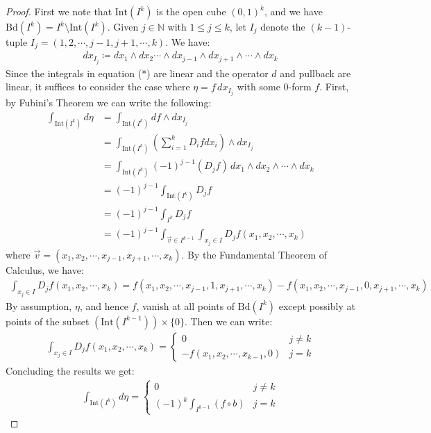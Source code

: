 \documentclass[11pt,oneside]{book}
\theoremstyle{break}
\theoremstyle{break}
\newcommand{\N}{\mathbb{N}}
\newcommand{\Int}{\text{Int}}
\newcommand{\Bd}{\text{Bd}}
\begin{document}
\begin{proof}
First we note that $\Int(I^k)$ is the open cube $(0,1)^k$, and we have $\Bd(I^k) = I^k \setminus \Int(I^k)$. Given $j \in \N$ with $1\leq j \leq k$, let $I_j$ denote the $(k-1)$-tuple $I_j=(1,2,\cdots, j-1, j+1, \cdots, k)$. We have:
\begin{align*}
dx_{I_j} \coloneqq dx_1 \wedge dx_2 \cdots \wedge dx_{j-1}\wedge dx_{j+1}\wedge \cdots \wedge dx_k
\end{align*}
Since the integrals in equation (*) are linear and the operator $d$ and pullback are linear, it suffices to consider the case where $\eta = f\, dx_{I_{j}}$ with some $0$-form $f$. First, by Fubini's Theorem we can write the following:
\begin{align*}
\int_{\Int(I^k)} d\eta 
&= \int_{\Int(I^k)} df \wedge dx_{I_j} \\
&= \int_{\Int(I^k)} \left( \sum_{i=1}^k D_i fdx_i\right) \wedge dx_{I_j}\\
&= \int_{\Int(I^k)} (-1)^{j-1}(D_j f)\, dx_1 \wedge dx_2 \wedge \cdots \wedge dx_k\\
&= (-1)^{j-1}\int_{\Int(I^k)} D_j f\\
&= (-1)^{j-1}\int_{I^k} D_j f\\
&= (-1)^{j-1}\int_{\vec{v}\in I^{k-1}}\int_{x_j \in I} D_j f(x_1, x_2,\cdots, x_k)
\end{align*}
where $\vec{v} = (x_1,x_2,\cdots, x_{j-1}, x_{j+1}, \cdots, x_k)$. By the Fundamental Theorem of Calculus, we have:
\begin{align*}
\int_{x_j \in I} D_j f(x_1, x_2,\cdots, x_k) = f(x_1,x_2,\cdots, x_{j-1}, 1, x_{j+1}, \cdots, x_k) - f(x_1,x_2,\cdots, x_{j-1}, 0, x_{j+1}, \cdots, x_k)
\end{align*}
By assumption, $\eta$, and hence $f$, vanish at all points of $\Bd(I^k)$ except possibly at points of the subset $(\Int(I^{k-1}))\times \{0\}$. Then we can write:
\begin{align*}
\int_{x_j \in I} D_j f(x_1, x_2,\cdots, x_k)  = \begin{cases}
0 & j \neq k\\
-f(x_1,x_2,\cdots, x_{k-1}, 0) & j=k
\end{cases}
\end{align*}
Concluding the results we get:
\begin{align*}
\int_{\Int(I^k)} d\eta  = 
\begin{cases} 0  & j\neq k\\
(-1)^k \int_{I^{k-1}}(f\circ b) & j=k
\end{cases}

\end{align*}
\end{proof}
\end{document}
